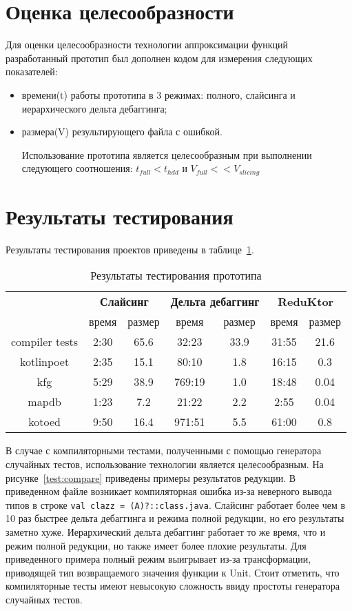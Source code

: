 \section{Оценка целесообразности}
Для оценки целесообразности технологии аппроксимации функ­ций разработанный прототип был дополнен кодом для измерения следующих показателей:
\begin{itemize}
	\item времени(t) работы прототипа в 3 режимах: полного, слайсинга и иерархического дельта дебаггинга;
	\item размера(V) результирующего файла с ошибкой.
	
Использование прототипа является целесообразным при выполнении следующего соотношения: $t_{full} < t_{hdd}$ и $V_{full} << V_{slicing}$
\end{itemize}


\section{Результаты тестирования}
Результаты тестирования проектов приведены в таблице~\ref{tab:testing}.
\begin{table}[]
\center
\caption{\label{tab:testing}Результаты тестирования прототипа}
\begin{tabular}{| c | c | c | c | c | c | c |}
\hline
\bf \multirow{2}{*}{Проект} & \multicolumn{2}{|c|}{\bf Слайсинг} & \multicolumn{2}{|c|}{\bf Дельта дебаггинг}  & \multicolumn{2}{|c|}{\bf ReduKtor} \\
\cline{2-7}
& время & размер & время & размер & время & размер \\
\hline
compiler tests & 2:30 & 65.6 & 32:23 & 33.9 & 31:55 & 21.6 \\
\hline
kotlinpoet & 2:35 & 15.1 & 80:10 & 1.8 & 16:15 & 0.3 \\
\hline
kfg & 5:29 & 38.9 & 769:19 & 1.0 & 18:48 & 0.04 \\
\hline
mapdb & 1:23 & 7.2 & 21:22 & 2.2 & 2:55 & 0.04 \\
\hline
kotoed & 9:50 & 16.4 & 971:51 & 5.5 & 61:00 & 0.8 \\
\hline
\end{tabular}
\end{table}
В случае с компиляторными тестами, полученными с помощью генератора случайных тестов, использование технологии является целесообразным. На рисунке~\ref{test:compare} приведены примеры результатов редукции. В приведенном файле возникает компиляторная ошибка из-за неверного вывода типов в строке \texttt{val clazz = (A)?::class.java}. Слайсинг работает более чем в 10 раз быстрее дельта дебаггинга и режима полной редукции, но его результаты заметно хуже. Иерархический дельта дебаггинг работает то же время, что и режим полной редукции, но также имеет более плохие результаты. Для приведенного примера полный режим выигрывает из-за трансформации, приводящей тип возвращаемого значения функции к Unit. Стоит отметить, что компиляторные тесты имеют невысокую сложность ввиду простоты генератора случайных тестов. 


